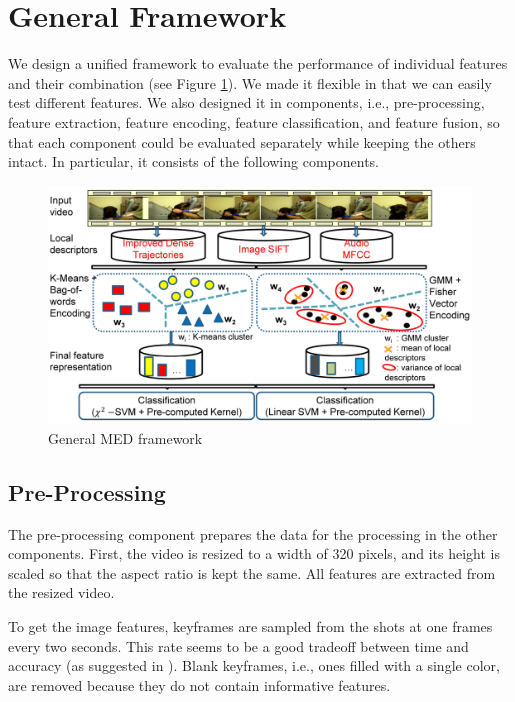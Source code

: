 \section{General Framework}

We design a unified framework to evaluate the performance of individual features and their combination (see Figure \ref{med_framework}). We made it flexible in that we can easily test different features. We also designed it in components, i.e., pre-processing, feature extraction, feature encoding, feature classification, and feature fusion, so that each component could be evaluated separately while keeping the others intact. In particular, it consists of the following components.

\begin{figure}
	\centering
	\includegraphics[width=1\textwidth]{framework.pdf}
	\caption{General MED framework}
	\label{med_framework}
\end{figure}

\subsection{Pre-Processing}

The pre-processing component prepares the data for the processing in the other components. First, the video is resized to a width of 320 pixels, and its height is scaled so that the aspect ratio is kept the same. All features are extracted from the resized video. 

To get the image features, keyframes are sampled from the shots at one frames every two seconds. This rate seems to be a good tradeoff between time and accuracy (as suggested in \cite{trecvid10:cuucf}). Blank keyframes, i.e., ones filled with a single color, are removed because they do not contain informative features.

